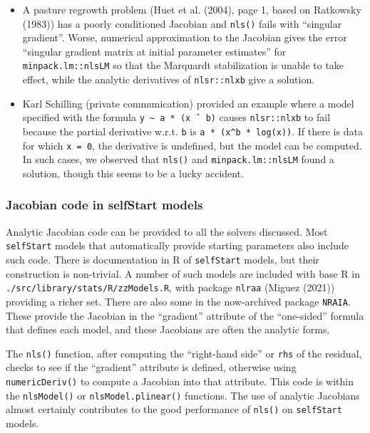 \begin{itemize}
\item
  A pasture regrowth problem (Huet et al. (2004), page 1, based on Ratkowsky (1983)) has a
  poorly conditioned Jacobian and \texttt{nls()} fails with ``singular gradient''.
  Worse, numerical approximation to the Jacobian gives the error
  ``singular gradient matrix at initial parameter estimates'' for \texttt{minpack.lm::nlsLM}
  so that the Marquardt stabilization is unable to take effect, while the analytic
  derivatives of \texttt{nlsr::nlxb} give a solution.
\item
  Karl Schilling (private communication) provided an example where a model specified
  with the formula \texttt{y\ \textasciitilde{}\ a\ *\ (x\ ˆ\ b)} causes \texttt{nlsr::nlxb} to fail because the partial
  derivative w.r.t. \texttt{b} is \texttt{a\ *\ (x\^{}b\ *\ log(x))}. If there is data for which \texttt{x\ =\ 0},
  the derivative is undefined, but the model can be computed. In such cases,
  we observed that \texttt{nls()} and
  \texttt{minpack.lm::nlsLM} found a solution, though this seems to be a lucky accident.
\end{itemize}

\hypertarget{jacobian-code-in-selfstart-models}{%
\subsubsection{Jacobian code in selfStart models}\label{jacobian-code-in-selfstart-models}}

Analytic Jacobian code can be provided to all the solvers discussed.
Most \texttt{selfStart} models that automatically provide starting parameters
also include such code. There is documentation in R
of \texttt{selfStart} models, but their construction is non-trivial. A number
of such models are included with base R in \texttt{./src/library/stats/R/zzModels.R},
with package \texttt{nlraa} (Miguez (2021)) providing a richer set.
There are also some in the now-archived package \texttt{NRAIA}.
These provide the Jacobian in the ``gradient'' attribute of the ``one-sided'' formula
that defines each model, and these Jacobians are often the analytic forms.

The \texttt{nls()} function, after
computing the ``right-hand side'' or \texttt{rhs} of the residual, checks to see if the
``gradient'' attribute is defined, otherwise using \texttt{numericDeriv()} to compute a
Jacobian into that attribute. This code is within the \texttt{nlsModel()} or
\texttt{nlsModel.plinear()} functions. The use of analytic Jacobians
almost certainly contributes to the good performance of \texttt{nls()} on \texttt{selfStart}
models.

